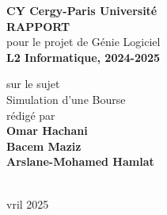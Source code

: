 
\begin{titlepage}{
    \begin{center}
        \vspace* {25mm}
        {\Large \textbf {CY Cergy-Paris Université}} \\
        \vspace* {10mm}
        {\Large \textbf {RAPPORT}} \\
        \vspace* {10mm}
        pour le projet de Génie Logiciel \\
        \textbf {L2 Informatique, 2024-2025} \\
        \vspace* {10mm}

	sur le sujet \\
        \vspace* {8mm}
	{\Huge \textsf{Simulation d'une Bourse}} \\
        \vspace* {8mm}
 	rédigé par \\
        \vspace* {8mm}
        {\Large \textbf {Omar Hachani
        \\ Bacem Maziz  \\ Arslane-Mohamed Hamlat}} \\
				\vspace* {10mm}
				 \\
        \date Avril 2025
        \vspace* {10mm}
	\end{center}
}
\end{titlepage}
